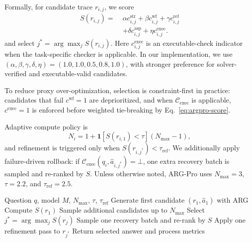\documentclass{article}
\begin{document}
Formally, for candidate trace \(r_{i,j}\), we score
\begin{equation}
\label{eq:argpro-score}
\begin{aligned}
S(r_{i,j})=\;&\alpha c^{\text{str}}_{i,j}+\beta c^{\text{wf}}_{i,j}+\gamma c^{\text{ref}}_{i,j} \\
&+\delta c^{\text{asp}}_{i,j}+\eta c^{\text{exec}}_{i,j}.
\end{aligned}
\end{equation}
and select \(j^*=\arg\max_j S(r_{i,j})\). Here \(c^{\text{exec}}_{i,j}\) is an executable-check indicator when the task-specific checker is applicable.
In our implementation, we use \((\alpha,\beta,\gamma,\delta,\eta)=(1.0,1.0,0.5,0.8,1.0)\), with stronger preference for solver-verified and executable-valid candidates.

To reduce proxy over-optimization, selection is constraint-first in practice: candidates that fail \(c^{\text{wf}}=1\) are deprioritized, and when \(\mathcal{C}_{\text{exec}}\) is applicable, \(c^{\text{exec}}=1\) is enforced before weighted tie-breaking by Eq.~\eqref{eq:argpro-score}.

Adaptive compute policy is
\begin{equation}
\label{eq:adaptive-compute}
N_i = 1 + \mathbf{1}[S(r_{i,1})<\tau](N_{\max}-1),
\end{equation}
and refinement is triggered only when \(S(r_{i,j^*})<\tau_{\text{ref}}\). We additionally apply failure-driven rollback: if \(\mathcal{C}_{\text{exec}}(q_i,\hat a_{i,j^*})=\bot\), one extra recovery batch is sampled and re-ranked by \(S\).
Unless otherwise noted, ARG-Pro uses \(N_{\max}=3\), \(\tau=2.2\), and \(\tau_{\text{ref}}=2.5\).

\begin{algorithm}[t]
\caption{ARG-Pro Inference (single instance)}
\label{alg:argpro}
\begin{algorithmic}[1]
\REQUIRE Question \(q\), model \(M\), \(N_{\max}\), \(\tau\), \(\tau_{\text{ref}}\)
\STATE Generate first candidate \((r_1, \hat a_1)\) with ARG
\STATE Compute \(S(r_1)\)
  \STATE Sample additional candidates up to \(N_{\max}\)
\ENDIF
\STATE Select \(j^*=\arg\max_j S(r_j)\)
  \STATE Sample one recovery batch and re-rank by \(S\)
\ENDIF
{}
  \STATE Apply one refinement pass to \(r_{j^*}\)
\ENDIF
\STATE Return selected answer and process metrics
\end{algorithmic}
\end{algorithm}
\end{document}
